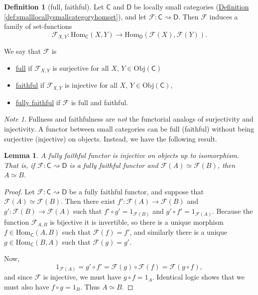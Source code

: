 \documentclass[a4paper,10pt]{scrreprt}
\newcommand{\defn}[1]{\ul{#1}}
\newcommand{\Obj}{\mathrm{Obj}}
\newcommand{\Hom}{\mathrm{Hom}}
\theoremstyle{definition}
\newtheorem{definition}{Definition}[section]
\theoremstyle{plain}
\newtheorem{lemma}{Lemma}[section]
\theoremstyle{remark}
\newtheorem{note}{Note}[section]
\begin{document}
\begin{definition}[full, faithful]
  \label{def:fullfaithfulfunctor}
  Let $\mathsf{C}$ and $\mathsf{D}$ be locally small categories (\hyperref[def:smalllocallysmallcategoryhomset]{Definition \ref*{def:smalllocallysmallcategoryhomset}}), and let $\mathcal{F}: \mathsf{C} \rightsquigarrow \mathsf{D}$. Then $\mathcal{F}$ induces a family of set-functions
  \begin{equation*}
    \mathcal{F}_{X, Y}\colon \Hom_{\mathsf{C}}(X, Y) \to \Hom_{\mathsf{D}}(\mathcal{F}(X), \mathcal{F}(Y)).
  \end{equation*}

  We say that $\mathcal{F}$ is
  \begin{itemize}
    \item \defn{full} if $\mathcal{F}_{X, Y}$ is surjective for all $X$, $Y \in \Obj(\mathsf{C})$
    \item \defn{faithful} if $\mathcal{F}_{X, Y}$ is injective for all $X$, $Y \in \Obj(\mathsf{C})$,
    \item \defn{fully faithful} if $\mathcal{F}$ is full and faithful.
  \end{itemize}
\end{definition}

\begin{note}
  Fullness and faithfulness are \emph{not} the functorial analogs of surjectivity and injectivity. A functor between small categories can be full (faithful) without being surjective (injective) on objects. Instead, we have the following result.
\end{note}

\begin{lemma}
  \label{lemma:fullyfaithfulfunctorinjectiveuptoisomorphism}
  A fully faithful functor is injective on objects up to isomorphism. That is, if $\mathcal{F}\colon \mathsf{C} \rightsquigarrow \mathsf{D}$ is a fully faithful functor and $\mathcal{F}(A) \simeq \mathcal{F}(B)$, then $A \simeq B$.
\end{lemma}
\begin{proof}
  Let $\mathcal{F}\colon \mathsf{C} \rightsquigarrow \mathsf{D}$ be a fully faithful functor, and suppose that $\mathcal{F}(A) \simeq \mathcal{F}(B)$. Then there exist $f'\colon \mathcal{F}(A) \to \mathcal{F}(B)$ and $g'\colon \mathcal{F}(B) \to \mathcal{F}(A)$ such that $f' \circ g' = 1_{\mathcal{F}(B)}$ and $g' \circ f' = 1_{\mathcal{F}(A)}$. Because the function $\mathcal{F}_{A, B}$ is bijective it is invertible, so there is a unique morphism $f \in \Hom_{\mathsf{C}}(A, B)$ such that $\mathcal{F}(f) = f'$, and similarly there is a unique $g \in \Hom_{\mathsf{C}}(B, A)$ such that $\mathcal{F}(g) = g'$.

  Now, 
  \begin{equation*}
    1_{\mathcal{F}(A)} = g' \circ f' = \mathcal{F}(g) \circ \mathcal{F}(f) = \mathcal{F}(g \circ f), 
  \end{equation*}
  and since $\mathcal{F}$ is injective, we must have $g \circ f = 1_{A}$. Identical logic shows that we must also have $f \circ g = 1_{B}$. Thus $A \simeq B$.
\end{proof}
\end{document}
